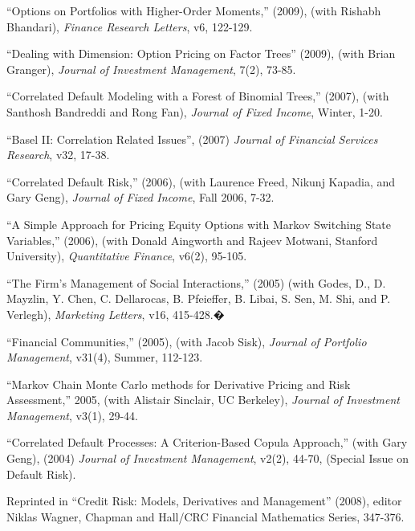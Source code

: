 \documentclass{article}
\begin{document}
\begin{etaremune}
\item ``Options on Portfolios with Higher-Order Moments,'' (2009), (with Rishabh Bhandari), {\it Finance Research Letters}, v6, 122-129.


\item ``Dealing with Dimension: Option Pricing on Factor Trees'' (2009), (with Brian Granger), 
{\it Journal of Investment Management}, 7(2), 73-85. 

\item ``Correlated Default Modeling with a Forest of Binomial Trees,'' (2007),
(with Santhosh Bandreddi and Rong Fan), {\it Journal of Fixed Income}, Winter, 1-20. 

\item ``Basel II: Correlation Related Issues'', (2007) {\it Journal of Financial Services Research}, v32, 17-38.

\item ``Correlated Default Risk,'' (2006), (with Laurence
Freed, Nikunj Kapadia, and Gary Geng), {\it Journal of Fixed Income},
Fall 2006, 7-32. 


\item ``A Simple Approach for Pricing Equity 
Options with Markov Switching State Variables,'' (2006), (with
Donald Aingworth and Rajeev Motwani, Stanford University), 
{\it Quantitative Finance}, v6(2), 95-105. 

\item ``The Firm's Management of Social Interactions,'' (2005) (with Godes, D., D. Mayzlin, Y. Chen, C. Dellarocas, B. Pfeieffer, B. Libai, S. Sen, M. Shi, and P. Verlegh), {\it Marketing Letters}, v16, 415-428.�

\item ``Financial Communities,'' (2005), (with Jacob Sisk), 
{\it Journal of Portfolio Management}, v31(4), Summer, 112-123.

\item ``Markov Chain Monte Carlo methods for 
Derivative Pricing and Risk Assessment,'' 2005,
(with Alistair Sinclair, UC Berkeley), {\it Journal 
of Investment Management}, v3(1), 29-44.

\item ``Correlated Default Processes: A Criterion-Based Copula Approach,''
(with Gary Geng), (2004) {\it Journal of Investment Management}, v2(2), 44-70, 
(Special Issue on Default Risk).

Reprinted in ``Credit Risk: Models, Derivatives and Management'' (2008), editor Niklas Wagner, Chapman and Hall/CRC Financial Mathematics Series, 347-376.


\end{etaremune}
\end{document}
